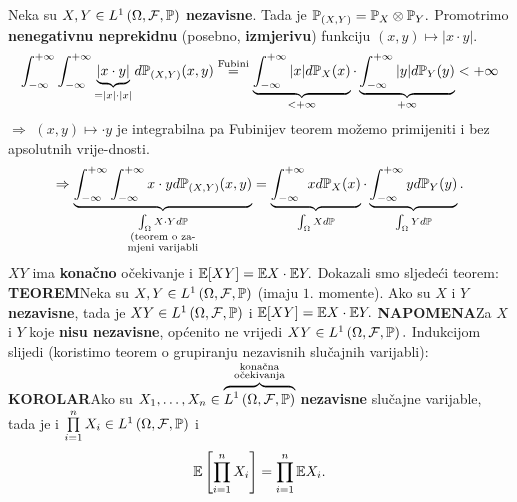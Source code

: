 \documentclass{article}
\begin{document}
Neka su \(X,Y\in L^1\left(\Omega,\mathcal F,\Bbb P\right)\) \textbf{nezavisne}. Tada je \(\Bbb P_{(X,Y)}=\Bbb P_X\otimes\Bbb P_Y.\) Promotrimo \textbf{nenegativnu neprekidnu} (posebno, \textbf{izmjerivu}) funkciju \((x,y)\mapsto |x\cdot y|.\) \[\int_{-\infty}^{+\infty}\int_{-\infty}^{+\infty}\underbrace{|x\cdot y|}_{=|x|\cdot|x|}d\Bbb P_{(X,Y)}(x,y)\overset{\text{Fubini}}{=}\underbrace{\int_{-\infty}^{+\infty}|x|d\Bbb P_X(x)}_{<+\infty}\cdot\underbrace{\int_{-\infty}^{+\infty}|y|d\Bbb P_Y(y)}_{+\infty}<+\infty\] \(\Rightarrow\) \((x,y)\mapsto \cdot y\) je  integrabilna pa Fubinijev teorem možemo primijeniti i bez apsolutnih vrije-\newline dnosti.  \[\begin{aligned}\Rightarrow\underbrace{\int_{-\infty}^{+\infty}\int_{-\infty}^{+\infty}x\cdot yd\Bbb P_{(X,Y)}(x,y)}_{\substack{\int_\Omega X\cdot Yd\Bbb P\\\text{(teorem o za-}\\\text{mjeni varijabli}}}=\underbrace{\int_{-\infty}^{+\infty}xd\Bbb P_X(x)}_{\int_\Omega Xd\Bbb P}\cdot\underbrace{\int_{-\infty}^{+\infty}yd\Bbb P_Y(y)}_{\int_\Omega Yd\Bbb P}.\end{aligned}\] \(XY\) ima \textbf{konačno} očekivanje i \(\Bbb E[XY]=\Bbb EX\cdot\Bbb EY.\)\newline\newline
Dokazali smo sljedeći teorem:\newline\newline
\textbf{TEOREM}\newline Neka su \(X,Y\in L^1\left(\Omega,\mathcal F,\Bbb P\right)\) (imaju \(1.\) momente). Ako su \(X\) i \(Y\) \textbf{nezavisne}, tada je \(XY\in L^1\left(\Omega,\mathcal F,\Bbb P\right)\) i \(\Bbb E[XY]=\Bbb EX\cdot\Bbb EY.\)\newline\newline
{}\textbf{NAPOMENA}\newline Za \(X\) i \(Y\) koje \textbf{nisu nezavisne}, općenito ne vrijedi \(XY\in L^1\left(\Omega,\mathcal F,\Bbb P\right).\)\newline\newline
Indukcijom slijedi (koristimo teorem o grupiranju nezavisnih slučajnih varijabli):\newline\newline
\textbf{KOROLAR}\newline Ako su \(X_1,\ldots,X_n\in \overbrace{L^1\left(\Omega,\mathcal F,\Bbb P\right)}^{\substack{\text{konačna}\\\text{očekivanja}}}\) \textbf{nezavisne} slučajne varijable, tada je i \(\prod\limits_{i=1}^nX_i\in L^1\left(\Omega,\mathcal F,\Bbb P\right)\) i  \[\Bbb E\left[\prod_{i=1}^nX_i\right]=\prod_{i=1}^n\Bbb EX_i.\] 
\end{document}

